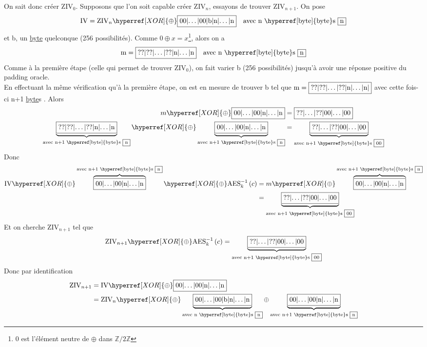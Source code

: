\documentclass[a4paper, 12pt]{article}
\begin{document}
\noindent On sait donc créer $\text{ZIV}_0$. Supposons que l'on soit capable créer $\text{ZIV}_n$, essayons de trouver $\text{ZIV}_{n+1}$. On pose 
$$\text{IV} = \text{ZIV}_n \hyperref[XOR]{\oplus} \fbox{00|$\dots$|00|b|n|$\dots$|n} \quad \text{avec n \hyperref[byte]{byte}s \fbox{n}}$$
 et b, un \hyperref[byte]{byte} quelconque (256 possibilités). Comme $0 \hyperref[XOR]{\oplus} x = x$\footnote{$0$ est l'élément neutre de \hyperref[XOR]{$\oplus$} dans $\mathbb{Z}/2\mathbb{Z}$}, alors on a 
$$\text{m} = \fbox{??|??|\dots|??|n|$\dots$|n} \quad \text{avec n \hyperref[byte]{byte}s \fbox{n}}$$
Comme à la première étape (celle qui permet de trouver $\text{ZIV}_0$), on fait varier b (256 possibilités) jusqu'à avoir une réponse positive du padding oracle. \\ En effectuant la même vérification qu'à la première étape, on est en mesure de trouver b tel que $\text{m} = \fbox{??|??|$\dots$|??|n|$\dots$|n|}$ avec cette fois-ci n+1 \hyperref[byte]{byte}s . Alors
\begin{align*}
	m \hyperref[XOR]{\oplus} \fbox{00|$\dots$|00|n|$\dots$|n} &= \fbox{??|$\dots$|??|00|$\dots$|00} \\
	\underbrace{\fbox{??|??|\dots|??|n|$\dots$|n}}_{\text{avec n+1 \hyperref[byte]{byte}s \fbox{n}}} \hyperref[XOR]{\oplus} \underbrace{\fbox{00|$\dots$|00|n|$\dots$|n}}_{\text{avec n+1 \hyperref[byte]{byte}s \fbox{n}}} &= \underbrace{\fbox{??|$\dots$|??|00|$\dots$|00}}_{\text{avec n+1 \hyperref[byte]{byte}s \fbox{00}}}
\end{align*}
Donc 
\begin{align*}
	\text{IV} \hyperref[XOR]{\oplus} \overbrace{\fbox{00|$\dots$|00|n|$\dots$|n}}^{\text{avec n+1 \hyperref[byte]{byte}s \fbox{n}}} \hyperref[XOR]{\oplus} \text{AES}^{-1}_k\left(c\right) &= m \hyperref[XOR]{\oplus} \overbrace{\fbox{00|$\dots$|00|n|$\dots$|n}}^{\text{avec n+1 \hyperref[byte]{byte}s \fbox{n}}}\\
					&= \underbrace{\fbox{??|$\dots$|??|00|$\dots$|00}}_{\text{avec n+1 \hyperref[byte]{byte}s \fbox{00}}}\end{align*}
Et on cherche $\text{ZIV}_{n+1}$ tel que 
$$\text{ZIV}_{n+1} \hyperref[XOR]{\oplus} \text{AES}^{-1}_k\left(c\right) = \underbrace{\fbox{??|$\dots$|??|00|$\dots$|00}}_{\text{avec n+1 \hyperref[byte]{byte}s \fbox{00}}}$$
Donc par identification
\begin{align*}
	\text{ZIV}_{n+1} &= \text{IV} \hyperref[XOR]{\oplus} \fbox{00|$\dots$|00|n|$\dots$|n}\\
			 &= \text{ZIV}_n \hyperref[XOR]{\oplus} \underbrace{\fbox{00|$\dots$|00|b|n|$\dots$|n}}_{\text{avec n \hyperref[byte]{byte}s \fbox{n}}} \oplus \underbrace{\fbox{00|$\dots$|00|n|$\dots$|n}}_{\text{avec n+1 \hyperref[byte]{byte}s \fbox{n}}}
\end{align*}
\end{document}
